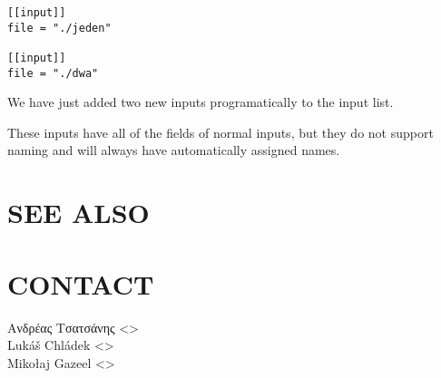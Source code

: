\documentclass[a4paper,english]{article}
\begin{document}
\begin{adjustwidth}{18pt}{0pt}
            \begin{verbatim}
[[input]]
file = "./jeden"

[[input]]
file = "./dwa"
            \end{verbatim}
            We have just added two new inputs programatically to the input list.

            These inputs have all of the fields of normal inputs, but
            they do not support naming and will always have automatically assigned
            names.

  \section{SEE ALSO}
       

    \section{CONTACT}
    Ανδρέας Τσατσάνης <>\\[0.1cm]\MANbr
    Lukáš Chládek <>\\[0.1cm]\MANbr
    Mikołaj Gazeel <>\\[0.1cm]\MANbr

\end{adjustwidth}
\end{document}
